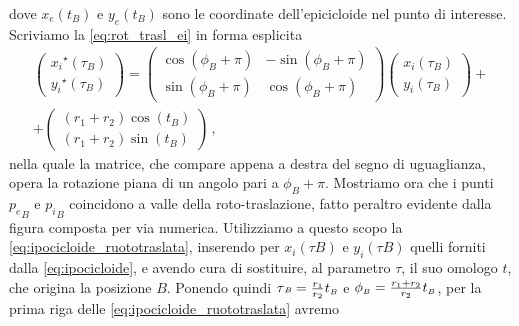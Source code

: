 \noindent dove ${x_e}\left(t_{\scriptscriptstyle B}\right)$ e
${y_e}\left(t_{\scriptscriptstyle B}\right)$ sono le coordinate 
dell'epicicloide nel punto di interesse.
\noindent Scriviamo la
\ref{eq:rot_trasl_ei} in forma esplicita
\begin{multline}
\begin{pmatrix} {x_i}^\star\left(\tau_{\scriptscriptstyle B}\right)\\{y_i}^\star\left(\tau_{\scriptscriptstyle B}\right) \end{pmatrix} =
\begin{pmatrix} \cos(\phi_{\scriptscriptstyle B}+\pi) &-\sin(\phi_{\scriptscriptstyle B}+\pi)\\
		 \sin(\phi_{\scriptscriptstyle B}+\pi) &\cos(\phi_{\scriptscriptstyle B}+\pi) \end{pmatrix}
\begin{pmatrix} {x_i}\left(\tau_{\scriptscriptstyle B}\right)\\{y_i}\left(\tau_{\scriptscriptstyle B}\right) \end{pmatrix} + \\
+ \begin{pmatrix} (r_1+r_2)\cos(t_{\scriptscriptstyle B})\\(r_1+r_2)\sin(t_{\scriptscriptstyle B}) \end{pmatrix}\,,
\label{eq:ipocicloide_ruototraslata}
\end{multline}
\noindent nella quale la matrice, che compare
appena a destra del segno di uguaglianza, opera la rotazione piana di un angolo 
pari a $\phi_{\scriptscriptstyle B}+\pi$.
\noindent Mostriamo ora che i punti
${p_e}_{\scriptscriptstyle B}$ e ${p_i}_{\scriptscriptstyle B}$ coincidono
a valle della roto-traslazione,
fatto peraltro evidente dalla figura composta per via numerica.
Utilizziamo a questo scopo la \ref{eq:ipocicloide_ruototraslata}, inserendo per
${x_i}\left(\tau{\scriptscriptstyle B}\right)$ e ${y_i}\left(\tau{\scriptscriptstyle B}\right)$
quelli forniti dalla \ref{eq:ipocicloide}, e avendo cura di sostituire, al
parametro $\tau$, il suo omologo $t$, che origina la posizione $B$.
Ponendo quindi $\tau{\scriptscriptstyle B} = {r_1\over{r_2}}t_{\scriptscriptstyle B}$ e
$\phi_{\scriptscriptstyle B}={{r_1+r_2}\over{r_2}}t_{\scriptscriptstyle B}$,
per la prima riga delle \ref{eq:ipocicloide_ruototraslata} avremo
